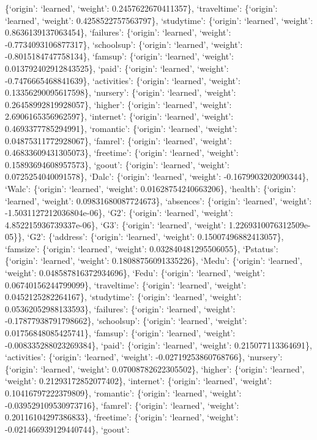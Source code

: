 \documentclass[
]{article}
\begin{document}
\{`origin': `learned', `weight': 0.2457622670411357\}, `traveltime':
\{`origin': `learned', `weight': 0.4258522757563797\}, `studytime':
\{`origin': `learned', `weight': 0.8636139137063454\}, `failures':
\{`origin': `learned', `weight': -0.7734093106877317\}, `schoolsup':
\{`origin': `learned', `weight': -0.8015184747758134\}, `famsup':
\{`origin': `learned', `weight': 0.013792402912843525\}, `paid':
\{`origin': `learned', `weight': -0.7476665468841639\}, `activities':
\{`origin': `learned', `weight': 0.13356290095617598\}, `nursery':
\{`origin': `learned', `weight': 0.26458992819928057\}, `higher':
\{`origin': `learned', `weight': 2.6906165356962597\}, `internet':
\{`origin': `learned', `weight': 0.4693377785294991\}, `romantic':
\{`origin': `learned', `weight': 0.04875311772928067\}, `famrel':
\{`origin': `learned', `weight': 0.46833609431305073\}, `freetime':
\{`origin': `learned', `weight': 0.15893694608957573\}, `goout':
\{`origin': `learned', `weight': 0.0725254040091578\}, `Dalc':
\{`origin': `learned', `weight': -0.1679903202090344\}, `Walc':
\{`origin': `learned', `weight': 0.01628754240663206\}, `health':
\{`origin': `learned', `weight': 0.09831680087724673\}, `absences':
\{`origin': `learned', `weight': -1.5031127212036804e-06\}, `G2':
\{`origin': `learned', `weight': 4.852215936739337e-06\}, `G3':
\{`origin': `learned', `weight': 1.2269310076312509e-05\}\}, `G2':
\{`address': \{`origin': `learned', `weight': 0.15007496882413057\},
`famsize': \{`origin': `learned', `weight': 0.032840481295506055\},
`Pstatus': \{`origin': `learned', `weight': 0.18088756091335226\},
`Medu': \{`origin': `learned', `weight': 0.048587816372934696\}, `Fedu':
\{`origin': `learned', `weight': 0.06740156244799099\}, `traveltime':
\{`origin': `learned', `weight': 0.0452125282264167\}, `studytime':
\{`origin': `learned', `weight': 0.05362052988133593\}, `failures':
\{`origin': `learned', `weight': -0.17877938791798662\}, `schoolsup':
\{`origin': `learned', `weight': 0.01756848085425741\}, `famsup':
\{`origin': `learned', `weight': -0.008335288023269384\}, `paid':
\{`origin': `learned', `weight': 0.215077113364691\}, `activities':
\{`origin': `learned', `weight': -0.02719253860768766\}, `nursery':
\{`origin': `learned', `weight': 0.07008782622305502\}, `higher':
\{`origin': `learned', `weight': 0.21293172852077402\}, `internet':
\{`origin': `learned', `weight': 0.10416797222379809\}, `romantic':
\{`origin': `learned', `weight': -0.039529109530973716\}, `famrel':
\{`origin': `learned', `weight': 0.20116104297386833\}, `freetime':
\{`origin': `learned', `weight': -0.021466939129440744\}, `goout':
\end{document}
